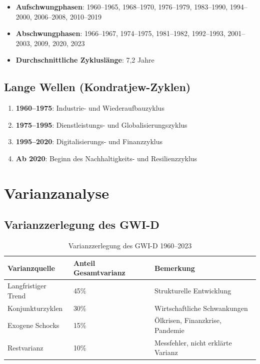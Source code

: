 \begin{itemize}
\item \textbf{Aufschwungphasen}: 1960--1965, 1968--1970, 1976--1979, 1983--1990, 1994--2000, 2006--2008, 2010--2019
\item \textbf{Abschwungphasen}: 1966--1967, 1974--1975, 1981--1982, 1992--1993, 2001--2003, 2009, 2020, 2023
\item \textbf{Durchschnittliche Zykluslänge}: 7,2 Jahre
\end{itemize}

\subsection{Lange Wellen (Kondratjew-Zyklen)}

\begin{enumerate}
\item \textbf{1960--1975}: Industrie- und Wiederaufbauzyklus
\item \textbf{1975--1995}: Dienstleistungs- und Globalisierungszyklus
\item \textbf{1995--2020}: Digitalisierungs- und Finanzzyklus
\item \textbf{Ab 2020}: Beginn des Nachhaltigkeits- und Resilienzzyklus
\end{enumerate}

\section{Varianzanalyse}

\subsection{Varianzzerlegung des GWI-D}

\begin{table}[ht]
\centering
\begin{tabular}{lll}
\toprule
\textbf{Varianzquelle} & \textbf{Anteil Gesamtvarianz} & \textbf{Bemerkung} \\
\midrule
Langfristiger Trend & 45\% & Strukturelle Entwicklung \\
Konjunkturzyklen & 30\% & Wirtschaftliche Schwankungen \\
Exogene Schocks & 15\% & Ölkrisen, Finanzkrise, Pandemie \\
Restvarianz & 10\% & Messfehler, nicht erklärte Varianz \\
\bottomrule
\end{tabular}
\caption{Varianzzerlegung des GWI-D 1960--2023}
\label{tab:varianz-zerlegung}
\end{table}

